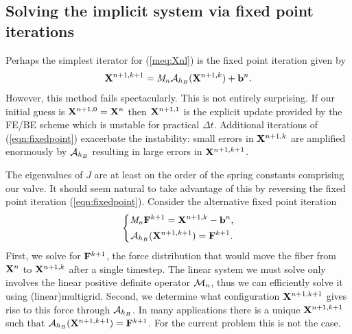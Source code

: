 \subsection{Solving the implicit system via fixed point iterations}
Perhaps the simplest iterator for (\ref{meq:Xnl}) is the fixed point iteration given by
\begin{equation}
\mathbf{X}^{n+1,k+1} = \mathit{M}_n\mathcal{A}_{h_B} (\mathbf{X}^{n+1,k}) + \mathbf{b}^n.
\label{eqn:fixedpoint}
\end{equation}
However, this method fails spectacularly. This is not entirely surprising.
 If our initial guess is $\mathbf{X}^{n+1,0}=\mathbf{X}^n$ then $\mathbf{X}^{n+1,1}$ is the explicit update provided by the FE/BE scheme which is unstable for practical $\Delta t$. Additional iterations of (\ref{eqn:fixedpoint}) exacerbate the instability: small errors in $\mathbf{X}^{n+1,k}$ are amplified enormously by $\mathcal{A}_{h_B}$ resulting in large errors in $\mathbf{X}^{n+1,k+1}$.

The eigenvalues of $J$ are at least on the order of the spring constants comprising our valve. It should seem natural to take advantage of this by reversing the fixed point iteration (\ref{eqn:fixedpoint}). Consider the alternative fixed point iteration
\begin{equation}
\left\{
\begin{gathered}
\mathit{M}_n\mathbf{F}^{k+1} = \mathbf{X}^{n+1,k} - \mathbf{b}^n,\\
\mathcal{A}_{h_B}(\mathbf{X}^{n+1,k+1}) = \mathbf{F}^{k+1}.
\end{gathered}
\right.
\label{eqn:fixedpoint2}
\end{equation}
First, we solve for $\mathbf{F}^{k+1}$, the force distribution that would move the fiber from $\mathbf{X}^n$ to $\mathbf{X}^{n+1,k}$ after a single timestep. The linear system we must solve only involves the linear positive definite operator $\mathcal{M}_n$, thus we can efficiently solve it using (linear)multigrid. Second, we determine what configuration $\mathbf{X}^{n+1,k+1}$ gives rise to this force through $\mathcal{A}_{h_B}$.
In many applications there is a unique $\mathbf{X}^{n+1,k+1}$ such that
$\mathcal{A}_{h_B}(\mathbf{X}^{n+1,k+1}) = \mathbf{F}^{k+1}$. For the current problem this is not the case.

